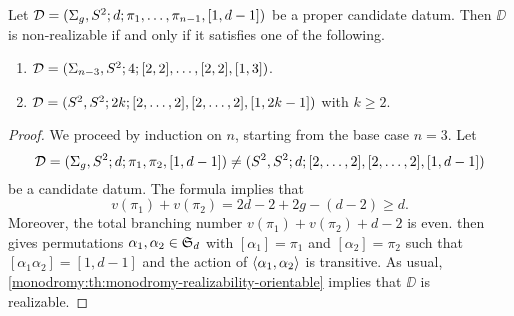 
\begin{proposition}\label{monodromy:th:sphere-[1 d-1]}
Let $\mathcal{D}=(\Sigma_{g},S^2{};d;\pi_1,\ldots,\pi_{n-1},[1,d-1])$ be a proper candidate datum. Then $\DD$ is non-realizable if and only if it satisfies one of the following.
\begin{enumerate}[(1)]
\item $\mathcal{D}=(\Sigma_{n-3},S^2{};4;[2,2],\ldots,[2,2],[1,3])$.
\item $\mathcal{D}=(S^2{},S^2{};2k;[2,\ldots,2],[2,\ldots,2],[1,2k-1])$ with $k\ge 2$.
\end{enumerate}
\end{proposition}
\begin{proof}
We proceed by induction on $n$, starting from the base case $n=3$. Let
\[
\mathcal{D}=(\Sigma_{g},S^2{};d;\pi_1,\pi_2,[1,d-1])\neq(S^2{},S^2{};d;[2,\ldots,2],[2,\ldots,2],[1,d-1])
\]
be a candidate datum. The \RH{} formula implies that
\[
v(\pi_1)+v(\pi_2)=2d-2+2g-(d-2)\ge d.
\]
Moreover, the total branching number $v(\pi_1)+v(\pi_2)+d-2$ is even.  then gives permutations $\alpha_1,\alpha_2\in\symgroup[d]$ with $[\alpha_1]=\pi_1$ and $[\alpha_2]=\pi_2$ such that $[\alpha_1\alpha_2]=[1,d-1]$ and the action of $\left\langle\alpha_1,\alpha_2\right\rangle$ is transitive. As usual, \cref{monodromy:th:monodromy-realizability-orientable} implies that $\DD$ is realizable.


\end{proof}
